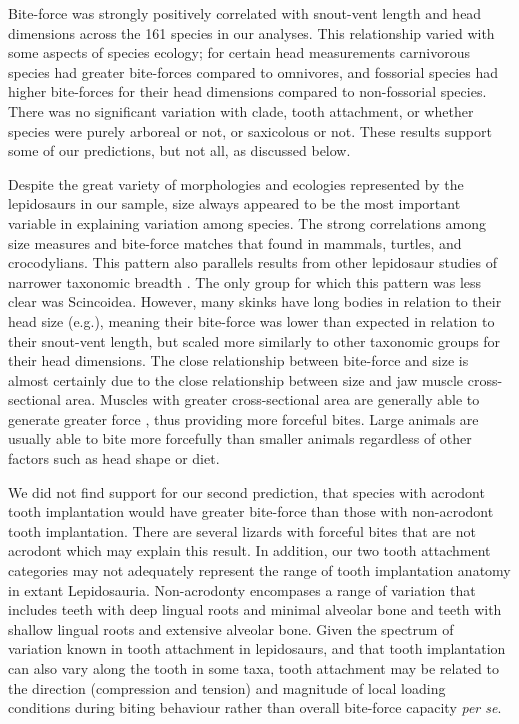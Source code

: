 \documentclass[a4paper, 12pt]{article}
\begin{document}
Bite-force was strongly positively correlated with snout-vent length and head dimensions across the 161 species in our analyses. 
This relationship varied with some aspects of species ecology; for certain head measurements carnivorous species had greater bite-forces compared to omnivores, and fossorial species had higher bite-forces for their head dimensions compared to non-fossorial species. 
There was no significant variation with clade, tooth attachment, or whether species were purely arboreal or not, or saxicolous or not. 
These results support some of our predictions, but not all, as discussed below.

Despite the great variety of morphologies and ecologies represented by the lepidosaurs in our sample, size always appeared to be the most important variable in explaining variation among species. 
The strong correlations among size measures and bite-force matches that found in mammals, turtles, and crocodylians\cite{aguirre2002ecomorphological,marshall2012ontogenetic,becerra2013biting,erickson2014comparative}.
This pattern also parallels results from other lepidosaur studies of narrower taxonomic breadth \cite{lailvaux2004performance,vanhooydonck2005does,MEASEY2009217,jones2020reproductive}.
The only group for which this pattern was less clear was Scincoidea. 
However, many skinks have long bodies in relation to their head size (e.g.\cite{wiens2006does}), meaning their bite-force was lower than expected in relation to their snout-vent length, but scaled more similarly to other taxonomic groups for their head dimensions. 
The close relationship between bite-force and size is almost certainly due to the close relationship between size and jaw muscle cross-sectional area. 
Muscles with greater cross-sectional area are generally able to generate greater force \cite{groning2013importance,sellers2017ontogeny}, thus providing more forceful bites. 
Large animals are usually able to bite more forcefully than smaller animals regardless of other factors such as head shape or diet. 

We did not find support for our second prediction, that species with acrodont tooth implantation would have greater bite-force than those with non-acrodont tooth implantation. 
There are several lizards with forceful bites that are not acrodont which may explain this result. 
In addition, our two tooth attachment categories may not adequately represent the range of tooth implantation anatomy in extant Lepidosauria. Non-acrodonty encompases a range of variation that includes teeth with deep lingual roots and minimal alveolar bone and teeth with shallow lingual roots and extensive alveolar bone\cite{smith1958evolutionary,presch1974,berkovitz2017}. 
Given the spectrum of variation known in tooth attachment in lepidosaurs\cite{bertin2018current}, and that tooth implantation can also vary along the tooth in some taxa, tooth attachment may be related to the direction (compression and tension) and magnitude of local loading conditions during biting behaviour rather than overall bite-force capacity \textit{per se}. 
 
\end{document}
